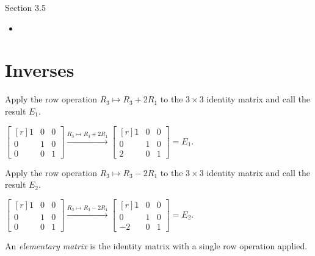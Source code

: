 \documentclass{problemset}
\newcommand{\mat}[1]{\begin{bmatrix*}[r]#1\end{bmatrix*}}
\begin{document}
\newpage
\pagestyle{siefken}

\begin{lesson}
	\newpage

	Section 3.5

	\begin{itemize}
		\item 
	\end{itemize}


	\newpage
\end{lesson}

\section*{Inverses}

	\question
	\begin{parts}
		\item Apply the row operation $R_3\mapsto R_3+2R_1$ to the $3\times 3$ identity
		matrix and call the result $E_1$.
			\begin{solution}	
				$\mat{1&0&0\\0&1&0\\0&0&1} \xrightarrow{R_3\mapsto R_3+2R_1} \mat{1&0&0\\0&1&0\\2&0&1}=E_1$.
			\end{solution}	
		\item Apply the row operation $R_3\mapsto R_3-2R_1$ to the $3\times 3$ identity
		matrix and call the result $E_2$.
			\begin{solution}	
				$\mat{1&0&0\\0&1&0\\0&0&1} \xrightarrow{R_3\mapsto R_3-2R_1} \mat{1&0&0\\0&1&0\\-2&0&1}=E_2$.
			\end{solution}	
	\end{parts}

	\begin{definition}
	An \emph{elementary matrix} is the identity matrix with a single row operation applied.
	\end{definition}
\end{document}
